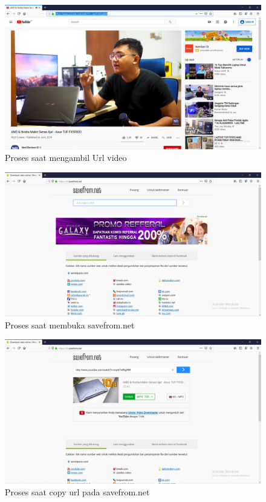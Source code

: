\begin{figure}[!htbp]
    \centering
    \includegraphics[scale=0.4]{figure/Antarmuka/3.png}
    \caption{ Proses saat mengambil Url video}
    \label{gambar 1}
\end{figure}

\begin{figure}[!htbp]
    \centering
    \includegraphics[scale=0.4]{figure/Antarmuka/4.png}
    \caption{ Proses saat membuka savefrom.net}
    \label{gambar 1}
\end{figure}


\begin{figure}[!htbp]
    \centering
    \includegraphics[scale=0.4]{figure/Antarmuka/5.png}
    \caption{Proses saat copy url pada savefrom.net}
    \label{gambar 1}
\end{figure}

